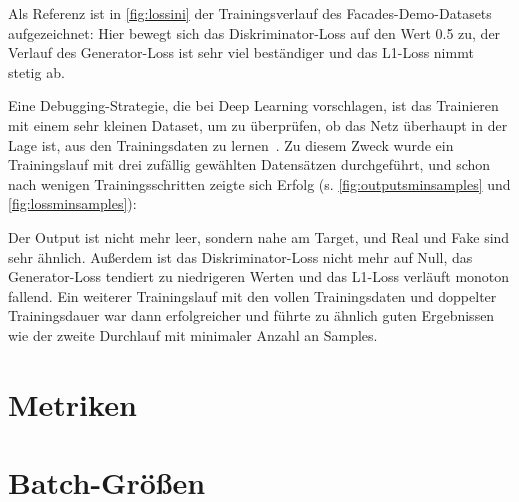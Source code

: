 
Als Referenz ist in \autoref{fig:lossini} der Trainingsverlauf des Facades-Demo-Datasets aufgezeichnet:
Hier bewegt sich das Diskriminator-Loss auf den Wert 0.5 zu, der Verlauf des Generator-Loss ist sehr viel beständiger und das L1-Loss nimmt stetig ab.

Eine Debugging-Strategie, die \citeauthor{Goodfellow.2016} bei Deep Learning vorschlagen, ist das Trainieren mit einem sehr kleinen Dataset, um zu überprüfen, ob das Netz überhaupt in der Lage ist, aus den Trainingsdaten zu lernen~\cite{Goodfellow.2016}.
Zu diesem Zweck wurde ein Trainingslauf mit drei zufällig gewählten Datensätzen durchgeführt, und schon nach wenigen Trainingsschritten zeigte sich Erfolg (s. \autoref{fig:outputsminsamples} und \autoref{fig:lossminsamples}):



Der Output ist nicht mehr leer, sondern nahe am Target, und Real und Fake sind sehr ähnlich.
Außerdem ist das Diskriminator-Loss nicht mehr auf Null, das Generator-Loss tendiert zu niedrigeren Werten und das L1-Loss verläuft monoton fallend.
Ein weiterer Trainingslauf mit den vollen Trainingsdaten und doppelter Trainingsdauer war dann erfolgreicher und führte zu ähnlich guten Ergebnissen wie der zweite Durchlauf mit minimaler Anzahl an Samples.



\section{Metriken}





\section{Batch-Größen}


